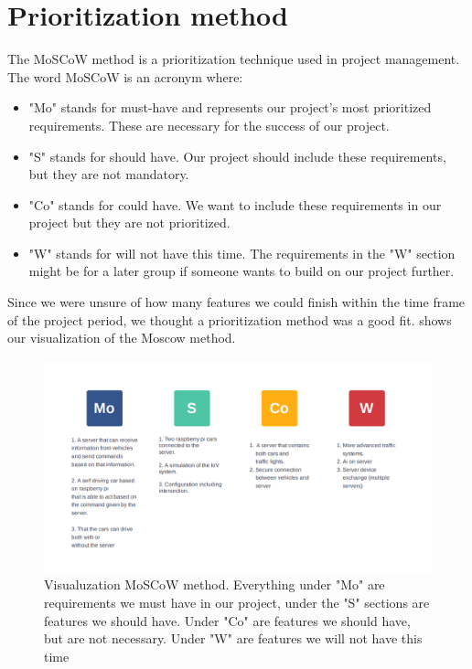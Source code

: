 \section{Prioritization method}
The MoSCoW method is a prioritization technique used in project management. The word MoSCoW is an acronym where:

\begin{itemize}
	\item "Mo" stands for must-have and represents our project's most prioritized requirements. These are necessary for the success of our project.
	\item "S" stands for should have. Our project should include these requirements, but they are not mandatory.
	\item "Co" stands for could have. We want to include these requirements in our project but they are not prioritized.
	\item "W" stands for will not have this time. The requirements in the "W" section might be for a later group if someone wants to build on our project further.
\end{itemize}

Since we were unsure of how many features we could finish within the time frame of the project period, we thought a prioritization method was a good fit.  shows our visualization of the Moscow method.

\begin{figure}[h!]
	\centering
	\includegraphics[width=1\linewidth]{figures/MosCoW_method}
	\caption[MosCoW method]{Visualuzation MoSCoW method. Everything under "Mo" are requirements we must have in our project, under the "S" sections are features we should have. Under "Co" are features we should have, but are not necessary. Under "W" are features we will not have this time}
	\label{fig:moscowmethod}
\end{figure}


